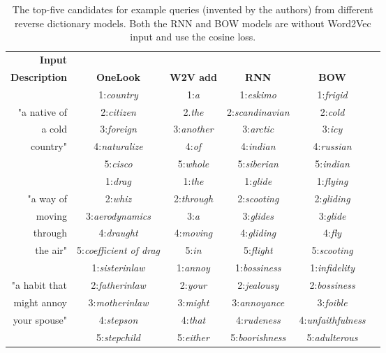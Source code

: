 \begin{table*}[ht]
\renewcommand{\tabcolsep}{4.6pt}
{\small
\emph
\hfill{}
\begin{tabular}{r|ccccc|}
\bf Input & \\
\bf Description & \bf OneLook & \bf W2V add &  \bf RNN  & \bf BOW \\
\hline

\rule{0pt}{3ex} 

 & 1:\emph{country} &  1:\emph{a}   &  1:\emph{eskimo}  &  1:\emph{frigid}   \\
"a native of  &  2:\emph{citizen} &   2.\emph{the}   &   2:\emph{scandinavian}   &  2:\emph{cold}    \\

a cold  & 3:\emph{foreign} &   3:\emph{another}  & 3:\emph{arctic}  & 3:\emph{icy} \\
country" &  4:\emph{naturalize} &   4:\emph{of}  & 4:\emph{indian}  &  4:\emph{russian}\\
 & 5:\emph{cisco} &  5:\emph{whole} &  5:\emph{siberian}  &  5:\emph{indian} \\
\rule{0pt}{6ex} 


 & 1:\emph{drag} &  1:\emph{the}   &  1:\emph{glide} &  1:\emph{flying} \\
  "a way of & 2:\emph{whiz} &  2:\emph{through}   &  2:\emph{scooting}  &   2:\emph{gliding} \\

moving  & 3:\emph{aerodynamics} &   3:\emph{a}  & 3:\emph{glides}  & 3:\emph{glide} \\
 through   & 4:\emph{draught} &  4:\emph{moving}  & 4:\emph{gliding}  & 4:\emph{fly}\\

 the air" & 5:\emph{coefficient of drag} &  5:\emph{in} &  5:\emph{flight} &  5:\emph{scooting}\\	


\rule{0pt}{6ex} 
                       & 1:\emph{sisterinlaw}  &  1:\emph{annoy}   &  1:\emph{bossiness}  &  1:\emph{infidelity}  \\
  "a habit that & 2:\emph{fatherinlaw} &   2:\emph{your}   &  2:\emph{jealousy} &  2:\emph{bossiness}  \\

might annoy & 3:\emph{motherinlaw}  &   3:\emph{might}  & 3:\emph{annoyance} & 3:\emph{foible} \\
 your spouse" & 4:\emph{stepson} &   4:\emph{that}  &  4:\emph{rudeness} &  4:\emph{unfaithfulness}\\

 & 5:\emph{stepchild} &  5:\emph{either} &  5:\emph{boorishness} &  5:\emph{adulterous} \\

\end{tabular}}
\hfill{}
\caption{The top-five candidates for example queries (invented by the authors) from different reverse dictionary models. Both the RNN and BOW models are without Word2Vec input and use the cosine loss.}
\label{qual}
\end{table*}

